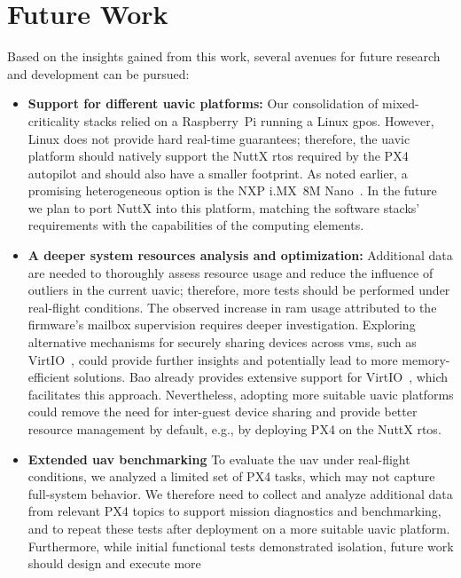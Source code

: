 \section{Future Work}
Based on the insights gained from this work, several
avenues for future research and development can be
pursued:
\begin{itemize}
\item \textbf{Support for different \gls{uavic} platforms:}
Our consolidation of mixed-criticality stacks relied on a Raspberry~Pi running a
Linux \gls{gpos}. However, Linux does not provide hard real-time guarantees;
therefore, the \gls{uavic} platform should natively support the NuttX \gls{rtos}
required by the PX4 autopilot and should also have a smaller footprint. As noted
earlier, a promising heterogeneous option is the NXP i.MX~8M Nano~\cite{imx8mn}.
In the future we plan to port NuttX into this platform,
matching the software stacks' requirements with the capabilities of the computing elements.
\item \textbf{A deeper system resources analysis and optimization:}
  Additional data are needed to thoroughly assess resource usage and reduce the
  influence of outliers in the current \gls{uavic}; therefore, more tests should
  be performed under real-flight conditions.
  The observed increase
  in \gls{ram} usage attributed to the firmware's mailbox supervision requires
  deeper investigation. Exploring alternative mechanisms for securely sharing
  devices across \glspl{vm}, such as VirtIO~\cite{peixoto-virtio-2024}, could provide further insights and
  potentially lead to more memory-efficient solutions. Bao already provides
  extensive support for VirtIO~\cite{costa2022virtio,ribeiro2023virtio,rocha_mitigating_2023,peixoto-virtio-2024,baoRepo},
  which facilitates this approach. Nevertheless, adopting more suitable
  \gls{uavic} platforms could remove the need for inter-guest device sharing and
  provide better resource management by default, e.g., by deploying PX4
  on the NuttX \gls{rtos}.
\item \textbf{Extended \gls{uav} benchmarking}
To evaluate the \gls{uav} under real-flight conditions, we analyzed a limited
set of PX4 tasks, which may not capture full-system behavior. We therefore need
to collect and analyze additional data from relevant PX4 topics to support
mission diagnostics and benchmarking, and to repeat these tests after deployment
on a more suitable \gls{uavic} platform.
Furthermore, while initial functional
tests demonstrated isolation, future work should design and execute more

\end{itemize}
